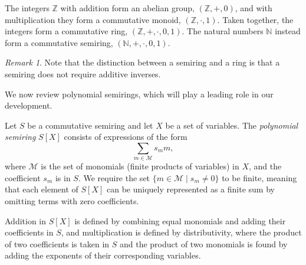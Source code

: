 \documentclass[oneside, 11pt]{amsbook}
\theoremstyle{plain}
\theoremstyle{definition}
\theoremstyle{remark}
\newtheorem*{remark}{Remark}
\begin{document}
\begin{exmpl}
    The integers $\mathbb{Z}$ with addition form an abelian group, $(\mathbb{Z}, +, 0)$, and with multiplication they form a commutative monoid, $(\mathbb{Z}, \cdot, 1)$. Taken together, the integers form a commutative ring, $(\mathbb{Z}, +, \cdot, 0, 1)$. The natural numbers $\mathbb{N}$ instead form a commutative semiring, $(\mathbb{N}, +, \cdot, 0, 1)$.
\end{exmpl}

\begin{remark}
    Note that the distinction between a semiring and a ring is that a semiring does not require additive inverses.
\end{remark}

We now review polynomial semirings, which will play a leading role in our development.

\begin{defn}
    Let $S$ be a commutative semiring and let $X$ be a set of variables. The \emph{polynomial semiring} $S[X]$ consists of expressions of the form
    \[
        \sum_{m \in \mathcal{M}} s_m m,
    \]
    where $\mathcal{M}$ is the set of monomials (finite products of variables) in $X$, and the coefficient $s_m$ is in $S$. We require the set $\{ m \in \mathcal{M} \mid s_m \neq 0 \}$ to be finite, meaning that each element of $S[X]$ can be uniquely represented as a finite sum by omitting terms with zero coefficients.

    Addition in $S[X]$ is defined by combining equal monomials and adding their coefficients in $S$, and multiplication is defined by distributivity, where the product of two coefficients is taken in $S$ and the product of two monomials is found by adding the exponents of their corresponding variables.
\end{defn}
\end{document}
